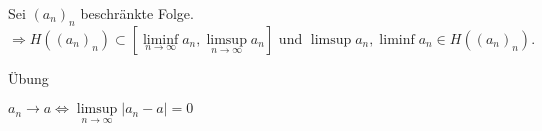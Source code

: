 \documentclass[../ana1.tex]{subfiles}
\begin{document}
\begin{kor}
	Sei \((a_n)_n\) beschränkte Folge.
	\[ \Rightarrow H((a_n)_n) \subset [ \liminf\limits_{n\rightarrow\infty}a_n, \limsup\limits_{n\rightarrow\infty}a_n ] \text{ und } \limsup a_n, \liminf a_n \in H((a_n)_n). \]
\end{kor}
\begin{bew}
	Übung
\end{bew}
\(a_n \rightarrow a \Leftrightarrow \limsup\limits_{n\rightarrow\infty}|a_n - a| = 0 \)
\end{document}
